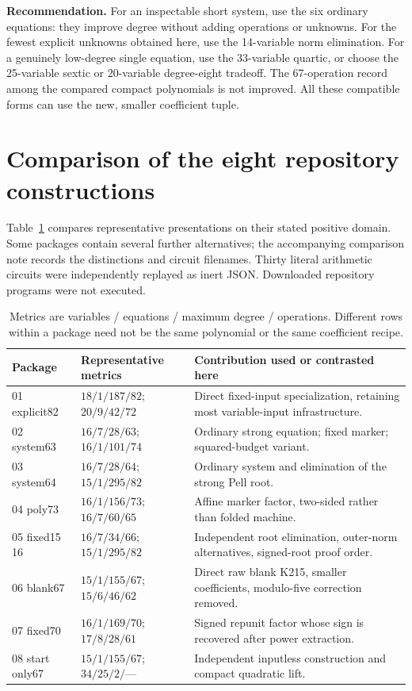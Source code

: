 \documentclass[11pt]{article}
\begin{document}
\textbf{Recommendation.} For an inspectable short system, use the six ordinary equations: they improve degree without adding operations or unknowns. For the fewest explicit unknowns obtained here, use the 14-variable norm elimination. For a genuinely low-degree single equation, use the 33-variable quartic, or choose the 25-variable sextic or 20-variable degree-eight tradeoff. The 67-operation record among the compared compact polynomials is not improved. All these compatible forms can use the new, smaller coefficient tuple.

\section{Comparison of the eight repository constructions}\label{sec:comparison}

Table~\ref{tab:packages} compares representative presentations on their stated positive domain. Some packages contain several further alternatives; the accompanying comparison note records the distinctions and circuit filenames. Thirty literal arithmetic circuits were independently replayed as inert JSON. Downloaded repository programs were not executed.

\begin{table}[ht]
\centering\small
\begin{tabular}{@{}p{.19\linewidth}p{.34\linewidth}p{.40\linewidth}@{}}
\toprule
Package & Representative metrics & Contribution used or contrasted here\\
\midrule
01 explicit82 & $18/1/187/82$; $20/9/42/72$ & Direct fixed-input specialization, retaining most variable-input infrastructure.\\
02 system63 & $16/7/28/63$; $16/1/101/74$ & Ordinary strong equation; fixed marker; squared-budget variant.\\
03 system64 & $16/7/28/64$; $15/1/295/82$ & Ordinary system and elimination of the strong Pell root.\\
04 poly73 & $16/1/156/73$; $16/7/60/65$ & Affine marker factor, two-sided rather than folded machine.\\
05 fixed15 16 & $16/7/34/66$; $15/1/295/82$ & Independent root elimination, outer-norm alternatives, signed-root proof order.\\
06 blank67 & $15/1/155/67$; $15/6/46/62$ & Direct raw blank K215, smaller coefficients, modulo-five correction removed.\\
07 fixed70 & $16/1/169/70$; $17/8/28/61$ & Signed repunit factor whose sign is recovered after power extraction.\\
08 start only67 & $15/1/155/67$; $34/25/2/\text{---}$ & Independent inputless construction and compact quadratic lift.\\
\bottomrule
\end{tabular}
\caption{Metrics are variables / equations / maximum degree / operations. Different rows within a package need not be the same polynomial or the same coefficient recipe.}\label{tab:packages}
\end{table}
\end{document}

